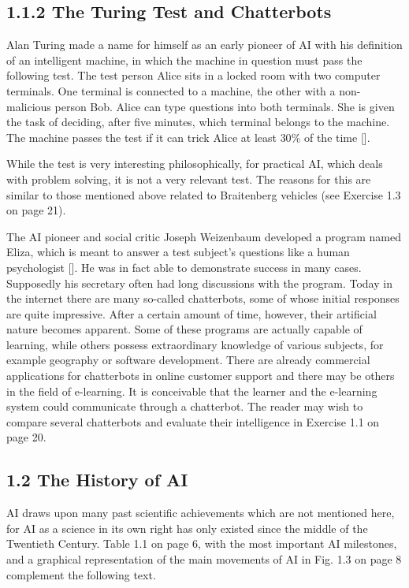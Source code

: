 \documentclass[10pt]{article}
\begin{document}
\subsection*{1.1.2 The Turing Test and Chatterbots}
Alan Turing made a name for himself as an early pioneer of AI with his definition of an intelligent machine, in which the machine in question must pass the following test. The test person Alice sits in a locked room with two computer terminals. One terminal is connected to a machine, the other with a non-malicious person Bob. Alice can type questions into both terminals. She is given the task of deciding, after five minutes, which terminal belongs to the machine. The machine passes the test if it can trick Alice at least $30 \%$ of the time [\cite{turing1950computing}].

While the test is very interesting philosophically, for practical AI, which deals with problem solving, it is not a very relevant test. The reasons for this are similar to those mentioned above related to Braitenberg vehicles (see Exercise 1.3 on page 21).

The AI pioneer and social critic Joseph Weizenbaum developed a program named Eliza, which is meant to answer a test subject's questions like a human psychologist [\cite{weizenbaum1966eliza}]. He was in fact able to demonstrate success in many cases. Supposedly his secretary often had long discussions with the program. Today in the internet there are many so-called chatterbots, some of whose initial responses are quite impressive. After a certain amount of time, however, their artificial nature becomes apparent. Some of these programs are actually capable of learning, while others possess extraordinary knowledge of various subjects, for example geography or software development. There are already commercial applications for chatterbots in online customer support and there may be others in the field of e-learning. It is conceivable that the learner and the e-learning system could communicate through a chatterbot. The reader may wish to compare several chatterbots and evaluate their intelligence in Exercise 1.1 on page 20.

\subsection*{1.2 The History of AI}
AI draws upon many past scientific achievements which are not mentioned here, for AI as a science in its own right has only existed since the middle of the Twentieth Century. Table 1.1 on page 6, with the most important AI milestones, and a graphical representation of the main movements of AI in Fig. 1.3 on page 8 complement the following text.
\end{document}
